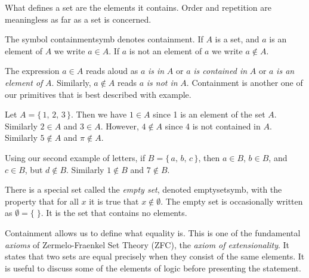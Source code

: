         What defines a set are the elements it contains. Order and repetition
        are meaningless as far as a set is concerned.
        \begin{notation}
            The symbol \gls{containmentsymb} denotes containment.
            If $A$ is a set, and $a$ is an element of $A$ we write
            $a\in{A}$. If $a$ is not an element of $a$ we write $a\notin{A}$.%
        \end{notation}
        The expression $a\in{A}$ reads aloud as $a$ \textit{is in} $A$ or
        $a$ \textit{is contained in} $A$ or $a$ \textit{is an element of} $A$.
        Similarly, $a\notin{A}$ reads $a$ \textit{is not in} $A$. Containment is
        another one of our primitives that is best described with example.
        \begin{example}
            Let $A=\{\,1,\,2,\,3\,\}$. Then we have $1\in{A}$ since 1 is an
            element of the set $A$. Similarly $2\in{A}$ and $3\in{A}$. However,
            $4\notin{A}$ since 4 is not contained in $A$. Similarly
            $5\notin{A}$ and $\pi\notin{A}$.
        \end{example}
        \begin{example}
            Using our second example of letters, if $B=\{\,a,\,b,\,c\,\}$, then
            $a\in{B}$, $b\in{B}$, and $c\in{B}$, but $d\notin{B}$. Similarly
            $1\notin{B}$ and $7\notin{B}$.
        \end{example}
        There is a special set called the \textit{empty set},
        denoted \gls{emptysetsymb}, with the property that for all $x$ it is
        true that $x\notin\emptyset$. The empty set is occasionally written as
        $\emptyset=\{\;\}$. It is the set that contains no elements.
        \par\hfill\par
        Containment allows us to define what equality is. This is one of the
        fundamental \textit{axioms} of Zermelo-Fraenkel Set Theory (ZFC), the
        \textit{axiom of extensionality}.
        It states that two sets are equal
        precisely when they consist of the same elements. It is useful to
        discuss some of the elements of logic before presenting the statement.
